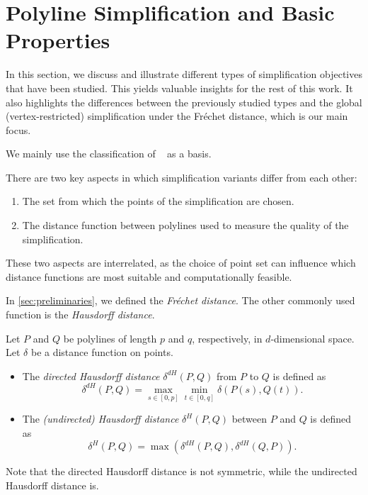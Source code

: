 \section{Polyline Simplification and Basic Properties}\label{sec:polyline-simplification}
In this section, we discuss and illustrate different types of simplification objectives that have been studied. This yields valuable insights for the rest of this work. It also highlights the differences between the previously studied types and the global (vertex-restricted) simplification under the Fréchet distance, which is our main focus.

We mainly use the classification of \citeauthor{global_curve_simplification}~\cite{global_curve_simplification} as a basis.

There are two key aspects in which simplification variants differ from each other:
\begin{enumerate}
  \item The set from which the points of the simplification are chosen.
	\item The distance function between polylines used to measure the quality of the simplification.
\end{enumerate}
These two aspects are interrelated, as the choice of point set can influence which distance functions are most suitable and computationally feasible.

In \cref{sec:preliminaries}, we defined the \emph{Fréchet distance}. The other commonly used function is the \emph{Hausdorff distance}.

\begin{definition}
  Let \(P\) and \(Q\) be polylines of length \(p\) and \(q\), respectively, in \(d\)-dimensional space. Let \(\delta\) be a distance function on points.
	\begin{itemize}
		\item The \emph{directed Hausdorff distance} \(\delta^{dH}(P, Q)\) from \(P\) to \(Q\) is defined as
		\[\delta^{dH}(P, Q) = \max_{s \in [0, p]}\min_{t \in [0, q]} \delta(P(s), Q(t)).\]
		\item The \emph{(undirected) Hausdorff distance} \(\delta^{H}(P, Q)\) between \(P\) and \(Q\) is defined as
		\[\delta^{H}(P, Q) = \max(\delta^{dH}(P, Q), \delta^{dH}(Q, P)).\]
	\end{itemize}
	Note that the directed Hausdorff distance is not symmetric, while the undirected Hausdorff distance is.
\end{definition}

